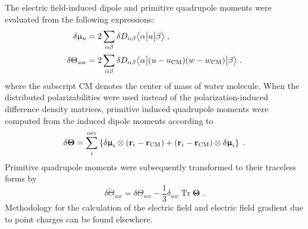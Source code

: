 \documentclass[aip,amsmath,amssymb,reprint,floatfix]{revtex4-1}
\newcommand{\tbraket}[3]{\ensuremath{\bigl\langle {#1} \bigl\lvert {#2} \bigl\lvert {#3} \bigr\rangle}}
\newcommand{\BM}[1]{\bm{#1}}
\DeclareMathOperator{\Tr}{Tr}
\begin{document}
The electric field\hyp{}induced dipole and primitive quadrupole moments were evaluated from the following expressions:
%
\begin{subequations}\label{e:dmult}
  \begin{align}
   \delta \upmu_{u}   &= 2\sum_{\alpha\beta} \delta D_{\alpha\beta} \tbraket{\alpha}{u}{\beta}  \;,\\
   \delta \Theta_{uw} &= 2\sum_{\alpha\beta} \delta D_{\alpha\beta} \tbraket{\alpha}{(u-u_{\rm CM})(w-w_{\rm CM})}{\beta} \;. 
  \end{align}
\end{subequations}
%
where the subscript CM denotes the center of mass of water molecule.
When the distributed polarizabilities were used instead of the polarization\hyp{}induced 
difference density matrices, primitive induced quadrupole moments were computed from
the induced dipole moments according to
%
\begin{equation}
  \delta {\BM \Theta} = \sum_i^{\rm occ} 
   \left\{ 
       \delta {\BM \upmu}_i \otimes \left( {\bf r}_i - {\bf r}_{\rm CM} \right) 
      + \left( {\bf r}_i - {\bf r}_{\rm CM} \right) \otimes \delta {\BM \upmu}_i
   \right\} \;.
\end{equation}
%
Primitive quadrupole moments were subsequently transformed to their traceless forms by
%
\begin{equation}
  \delta \widetilde{\Theta}_{uw} = \delta \Theta_{uw} - \frac{1}{3} \delta_{uw} \Tr{\BM\Theta} \;.
\end{equation}
%
Methodology for the calculation of the electric field and electric field gradient due to point charges
can be found elsewhere.\cite{Blasiak.Cho.JCP.2014}
\end{document}
